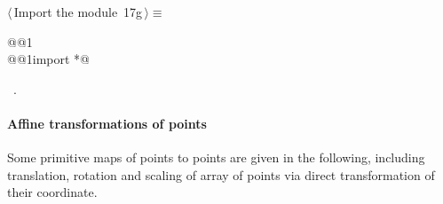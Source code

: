 \documentclass[11pt,oneside]{article}	%
\begin{document}
\begin{flushleft} \small \label{scrap42}
\protect{}$\langle\,$Import the module\nobreak\ {\footnotesize 17g}$\,\rangle\equiv$
\vspace{-1ex}
\begin{list}{}{} \item
\mbox{}\verb@import @@1\verb@@\\
\mbox{}\verb@from @@1\verb@ import *@\\
\mbox{}\verb@@{\NWsep}
\end{list}
\vspace{-1ex}
\footnotesize\addtolength{\baselineskip}{-1ex}
\begin{list}{}{\setlength{\itemsep}{-\parsep}\setlength{\itemindent}{-\leftmargin}}
\item \NWtxtMacroRefIn\ .
\end{list}
\end{flushleft}

\paragraph{Affine transformations of points} Some primitive maps of points to points are given in the following, including translation, rotation and scaling of array of points via direct transformation of their coordinate.
\end{document}
